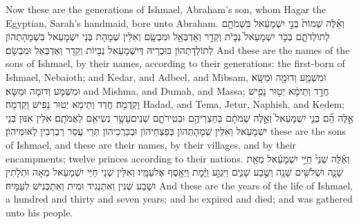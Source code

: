 {Now these are the generations of Ishmael, Abraham’s son, whom Hagar the Egyptian, Sarah’s handmaid, bore unto Abraham.}{}
{וְאֵ֗לֶּה שְׁמוֹת֙ בְּנֵ֣י יִשְׁמָעֵ֔אל בִּשְׁמֹתָ֖ם לְתוֹלְדֹתָ֑ם בְּכֹ֤ר יִשְׁמָעֵאל֙ נְבָיֹ֔ת וְקֵדָ֥ר וְאַדְבְּאֵ֖ל וּמִבְשָֽׂם׃}
{וְאִלֵּין שְׁמָהָת בְּנֵי יִשְׁמָעֵאל בִּשְׁמָהָתְהוֹן לְתוֹלְדָתְהוֹן בּוּכְרֵיהּ דְּיִשְׁמָעֵאל נְבָיוֹת וְקֵדָר וְאַדְבְּאֵל וּמִבְשָׂם׃}
{And these are the names of the sons of Ishmael, by their names, according to their generations: the first-born of Ishmael, Nebaioth; and Kedar, and Adbeel, and Mibsam,}{}
{וּמִשְׁמָ֥ע וְדוּמָ֖ה וּמַשָּֽׂא׃}
{וּמִשְׁמָע וְדוּמָה וּמַשָּׂא׃}
{and Mishma, and Dumah, and Massa;}{}
{חֲדַ֣ד וְתֵימָ֔א יְט֥וּר נָפִ֖ישׁ וָקֵֽדְמָה׃}
{חֲדַד וְתֵימָא יְטוּר נָפִישׁ וָקֵדְמָה׃}
{Hadad, and Tema, Jetur, Naphish, and Kedem;}{}
{אֵ֣לֶּה הֵ֞ם בְּנֵ֤י יִשְׁמָעֵאל֙ וְאֵ֣לֶּה שְׁמֹתָ֔ם בְּחַצְרֵיהֶ֖ם וּבְטִֽירֹתָ֑ם שְׁנֵים\maqqaf עָשָׂ֥ר נְשִׂיאִ֖ם לְאֻמֹּתָֽם׃}
{אִלֵּין אִנּוּן בְּנֵי יִשְׁמָעֵאל וְאִלֵּין שְׁמָהָתְהוֹן בְּפַצְחֵיהוֹן וּבְכַּרְכֵיהוֹן תְּרֵי עֲסַר רַבְרְבִין לְאוּמֵּיהוֹן׃}
{these are the sons of Ishmael, and these are their names, by their villages, and by their encampments; twelve princes according to their nations.}{}
{וְאֵ֗לֶּה שְׁנֵי֙ חַיֵּ֣י יִשְׁמָעֵ֔אל מְאַ֥ת שָׁנָ֛ה וּשְׁלֹשִׁ֥ים שָׁנָ֖ה וְשֶׁ֣בַע שָׁנִ֑ים וַיִּגְוַ֣ע וַיָּ֔מׇת וַיֵּאָ֖סֶף אֶל\maqqaf עַמָּֽיו׃}
{וְאִלֵּין שְׁנֵי חַיֵּי יִשְׁמָעֵאל מְאָה וּתְלָתִין וּשְׁבַע שְׁנִין וְאִתְנְגִיד וּמִית וְאִתְכְּנִישׁ לְעַמֵּיהּ׃}
{And these are the years of the life of Ishmael, a hundred and thirty and seven years; and he expired and died; and was gathered unto his people.}{}
